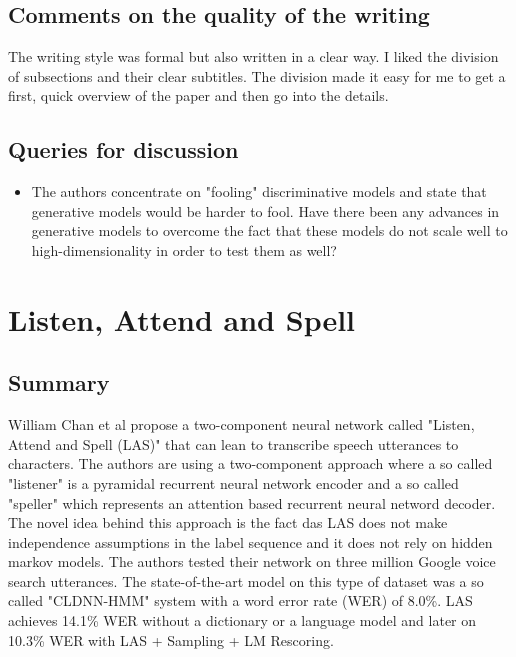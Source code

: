\documentclass[a4paper]{article}
\begin{document}
\subsection{Comments on the quality of the writing}

The writing style was formal but also written in a clear way. I liked the division of subsections and their clear subtitles. The division made it easy for me to get a first, quick overview of the paper and then go into the details.

\subsection{Queries for discussion}

\begin{itemize}
	\item The authors concentrate on "fooling" discriminative models and state that generative models would be harder to fool. Have there been any advances in generative models to overcome the fact that these models do not scale well to high-dimensionality in order to test them as well?
\end{itemize}


\section{Listen, Attend and Spell}

\subsection{Summary}

William Chan et al propose a two-component neural network called "Listen, Attend and Spell (LAS)" that can lean to transcribe speech utterances to characters. The authors are using a two-component approach where a so called "listener" is a pyramidal recurrent neural network encoder and a so called "speller" which represents an attention based recurrent neural netword decoder. The novel idea behind this approach is the fact das LAS does not make independence assumptions in the label sequence and it does not rely on hidden markov models. The authors tested their network on three million Google voice search utterances. The state-of-the-art model on this type of dataset was a so called "CLDNN-HMM" system with a word error rate (WER) of 8.0\%. LAS achieves 14.1\% WER without a dictionary or a language model and later on 10.3\% WER with LAS + Sampling + LM Rescoring.
\end{document}
